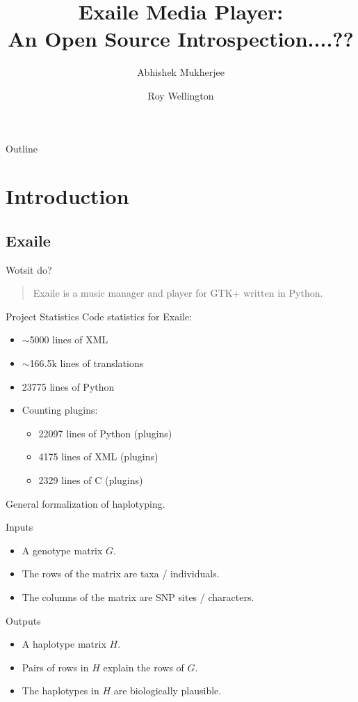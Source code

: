 \documentclass{beamer}
\title
{%
  Exaile Media Player:\\
  An Open Source Introspection....?? %
}
\author
{
  Abhishek Mukherjee \and
  Roy Wellington
}
\begin{document}
\begin{frame}
  \titlepage
\end{frame}

\begin{frame}{Outline}
  \tableofcontents
\end{frame}


\section{Introduction}

\subsection{Exaile}

\begin{frame}{Wotsit do?}
  \begin{quote}
    Exaile is a music manager and player for GTK+ written in Python.
  \end{quote}
\end{frame}

\begin{frame}{Project Statistics}
  Code statistics for Exaile:
  \begin{itemize}
    \item $\sim$5000 lines of XML
    \item $\sim$166.5k lines of translations
    \item 23775 lines of Python
	\item Counting plugins:
	\begin{itemize}
      \item 22097 lines of Python (plugins)
      \item 4175 lines of XML (plugins)
      \item 2329 lines of C (plugins)
	\end{itemize}
  \end{itemize}
\end{frame}

\begin{frame}[t]{General formalization of haplotyping.}
  \begin{block}{Inputs}
    \begin{itemize}
    \item A \alert{genotype matrix} $G$.
    \item The \alert{rows} of the matrix are \alert{taxa / individuals}.
    \item The \alert{columns} of the matrix are \alert{SNP sites /
        characters}. 
    \end{itemize}
  \end{block}
  \begin{block}{Outputs}
    \begin{itemize}
    \item A \alert{haplotype matrix} $H$.
    \item Pairs of rows in $H$ \alert{explain} the rows of $G$.
    \item The haplotypes in $H$ are \alert{biologically plausible}. 
    \end{itemize}
  \end{block}
\end{frame}
\end{document}
